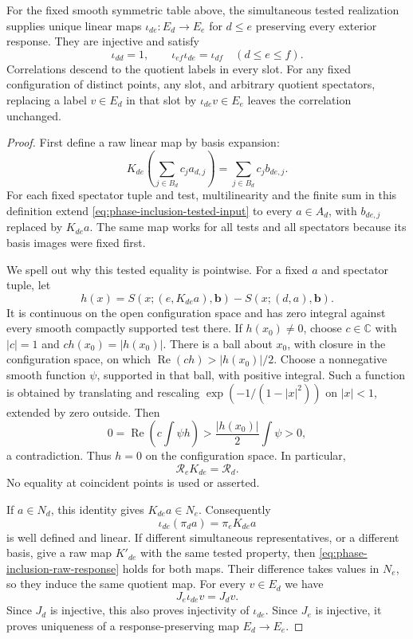 \begin{proposition}
\label{prop:phase-field-inclusions}
For the fixed smooth symmetric table above, the simultaneous tested
realization supplies unique linear maps
$\iota_{de}:E_d\to E_e$ for $d\le e$ preserving every exterior response.
They are injective and satisfy
\[
 \iota_{dd}=1,\qquad
 \iota_{ef}\iota_{de}=\iota_{df}\quad(d\le e\le f).
\]
Correlations descend to the quotient labels in every slot. For any fixed
configuration of distinct points, any slot, and arbitrary quotient
spectators, replacing a label $v\in E_d$ in that slot by
$\iota_{de}v\in E_e$ leaves the correlation unchanged.
\end{proposition}
\begin{proof}
First define a raw linear map by basis expansion:
\[
 K_{de}\left(\sum_{j\in B_d}c_ja_{d,j}\right)
       =\sum_{j\in B_d}c_jb_{de,j}.
\]
For each fixed spectator tuple and test, multilinearity and the finite sum
in this definition extend \eqref{eq:phase-inclusion-tested-input} to every
$a\in A_d$, with $b_{de,j}$ replaced by $K_{de}a$. The same map works for
all tests and all spectators because its basis images were fixed first.

We spell out why this tested equality is pointwise. For a fixed $a$ and
spectator tuple, let
\[
 h(x)=S(x;(e,K_{de}a),\boldsymbol b)
                   -S(x;(d,a),\boldsymbol b).
\]
It is continuous on the open configuration space and has zero integral
against every smooth compactly supported test there. If $h(x_0)\ne0$,
choose $c\in\mathbb C$ with $|c|=1$ and $c h(x_0)=|h(x_0)|$.
There is a ball about $x_0$, with closure in the configuration space,
on which $\operatorname{Re}(c h)>|h(x_0)|/2$. Choose a nonnegative smooth
function $\psi$, supported in that ball, with positive integral. Such a
function is obtained by translating and rescaling
$\exp(-1/(1-|x|^2))$ on $|x|<1$, extended by zero outside. Then
\[
 0=\operatorname{Re}\left(c\int\psi h\right)
   >\frac{|h(x_0)|}{2}\int\psi>0,
\]
a contradiction. Thus $h=0$ on the configuration space. In particular,
\begin{equation}\label{eq:phase-inclusion-raw-response}
                 \mathcal R_eK_{de}=\mathcal R_d.
\end{equation}
No equality at coincident points is used or asserted.

If $a\in N_d$, this identity gives $K_{de}a\in N_e$. Consequently
\[
               \iota_{de}(\pi_da)=\pi_eK_{de}a
\]
is well defined and linear. If different simultaneous representatives, or
a different basis, give a raw map $K'_{de}$ with the same tested property,
then \eqref{eq:phase-inclusion-raw-response} holds for both maps. Their
difference takes values in $N_e$, so they induce the same quotient map.
For every $v\in E_d$ we have
\begin{equation}\label{eq:phase-inclusion-faithful-response}
                     J_e\iota_{de}v=J_dv.
\end{equation}
Since $J_d$ is injective, this also proves injectivity of $\iota_{de}$.
Since $J_e$ is injective, it proves uniqueness of a response-preserving
map $E_d\to E_e$.


\end{proof}
